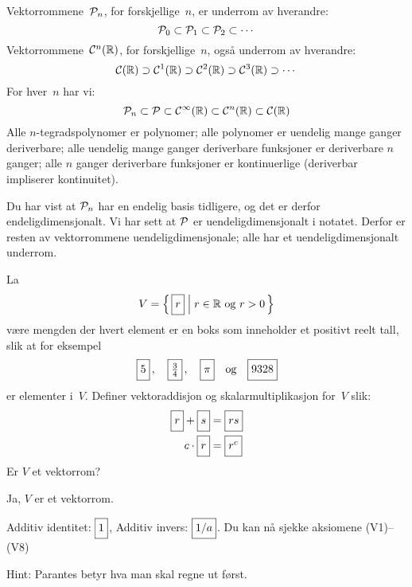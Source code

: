 \begin{losning}

\begin{punkt}
Vektorrommene~$\P_n$, for forskjellige~$n$, er underrom av hverandre:
\[
\P_0 \subset \P_1 \subset \P_2 \subset \cdots
\]
Vektorrommene~$\Cf^n(\R)$, for forskjellige~$n$, også
underrom av hverandre:
\[
\Cf(\R) \supset \Cf^1(\R) \supset \Cf^2(\R) \supset \Cf^3(\R) \supset \cdots
\]
For hver~$n$ har vi:
\[
\P_n \subset \P \subset \Cf^\infty(\R) \subset \Cf^n(\R) \subset \Cf(\R)
\]
Alle $n$-tegradspolynomer er polynomer;
alle polynomer er uendelig mange ganger deriverbare;
alle uendelig mange ganger deriverbare funksjoner er deriverbare $n$ ganger;
alle $n$ ganger deriverbare funksjoner er kontinuerlige (deriverbar impliserer kontinuitet).
\end{punkt}

\begin{punkt}
Du har vist at $\P_n$ har en endelig basis tidligere, og det er derfor endeligdimensjonalt.
Vi har sett at $\P$ er uendeligdimensjonalt i notatet.
Derfor er resten av vektorrommene uendeligdimensjonale; alle har et uendeligdimensjonalt underrom. 
\end{punkt}


\end{losning}



\begin{oppgave}
La
\[
V = \left\{\, \boks{r} \;\middle|\; \text{$r \in \R$ og $r > 0$} \,\right\}
\]
være mengden der hvert element er en boks som inneholder et positivt reelt tall,
slik at for eksempel
\[
\boks{5}\,,\quad
\boks{\frac{3}{4}}\,,\quad
\boks{\pi}\quad\text{og}\quad
\boks{9328}
\]
er elementer i~$V$.  Definer vektoraddisjon og skalarmultiplikasjon
for~$V$ slik:
\begin{align*}
\boks{r} + \boks{s} &= \boks{rs} \\
c \cdot \boks{r}    &= \boks{r^c}
\end{align*}
Er $V$ et vektorrom?
\end{oppgave}

\begin{losning}
Ja, $V$ er et vektorrom.

Additiv identitet: $\boks{1}$, Additiv invers: $\boks{1/a}$. Du kan nå sjekke aksiomene (V1)--(V8)

Hint: Parantes betyr hva man skal regne ut først.
\end{losning}

